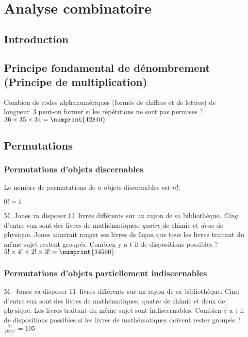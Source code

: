 \chapter{Analyse combinatoire}\label{chap:analyseCombinatoire}
\section{Introduction}

\section[Principe fondamental de dénombrement (Principe de multiplication)]{Principe fondamental de dénombrement\\(Principe de multiplication)}

 Combien de codes alphanumériques (formés de chiffres et de lettres) de longueur~3 peut-on former si les répétitions ne sont pas permises ?
\sol $36 \times 35 \times 34 = \numprint{42840}$



\section{Permutations}
\subsection{Permutations d’objets discernables}

Le nombre de permutations de $n$ objets discernables est $n!$.

$0! = 1$

 M. Jones va disposer 11~livres différents sur un rayon de sa bibliothèque. \emph{Cinq} d’entre eux sont des livres de mathématiques, \emph{quatre} de chimie et \emph{deux} de physique. Jones aimerait ranger ses livres de façon que tous les livres traitant du même sujet restent groupés. Combien y a-t-il de dispositions possibles ?
 $5! \times 4! \times 2! \times 3! = \numprint{34560}$


\subsection{Permutations d’objets partiellement indiscernables}
 M.~Jones va disposer 11~livres différents sur un rayon de sa bibliothèque. Cinq d’entre eux sont des livres de mathématiques, quatre de chimie et deux de physique. Les livres traitant du même sujet sont indiscernables. Combien y a-t-il de dispositions possibles si les livres de mathématiques doivent rester groupés ?
\sol $\frac{7!}{4!2!1!} = 105$

